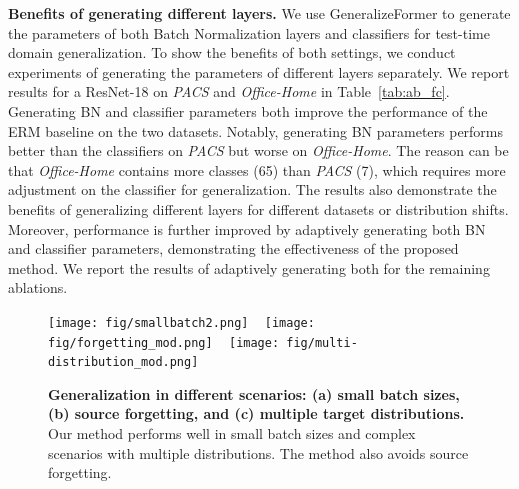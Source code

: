 \noindent
\textbf{Benefits of generating different layers.}
We use GeneralizeFormer to generate the parameters of both Batch Normalization layers and classifiers for test-time domain generalization.
To show the benefits of both settings, we conduct experiments of generating the parameters of different layers separately.
We report results for a ResNet-18 on \textit{PACS} and \textit{Office-Home} in Table~\ref{tab:ab_fc}.
Generating BN and classifier parameters both improve the performance of the ERM baseline on the two datasets. 
Notably, generating BN parameters performs better than the classifiers on \textit{PACS} but worse on \textit{Office-Home}. 
The reason can be that \textit{Office-Home} contains more classes (65) than \textit{PACS} (7), which requires more adjustment on the classifier for generalization.
The results also demonstrate the benefits of generalizing different layers for different datasets or distribution shifts. 
Moreover, performance is further improved by adaptively generating both BN and classifier parameters, demonstrating the effectiveness of the proposed method. 
We report the results of adaptively generating both for the remaining ablations.







\begin{figure*}[t]
\centering 
\centerline{   
    \texttt{[image: fig/smallbatch2.png]} ~
    \texttt{[image: fig/forgetting\_mod.png]} ~
    \texttt{[image: fig/multi-distribution\_mod.png]} ~
} 
\vspace{-4mm}
\caption{\textbf{Generalization in different scenarios: (a) small batch sizes, (b) source forgetting, and (c) multiple target distributions.} Our method performs well in small batch sizes and complex scenarios with multiple distributions. The method also avoids source forgetting. 
}
\vspace{-4mm}
\label{fig:investigate-limdata_gf}  
\end{figure*} 

